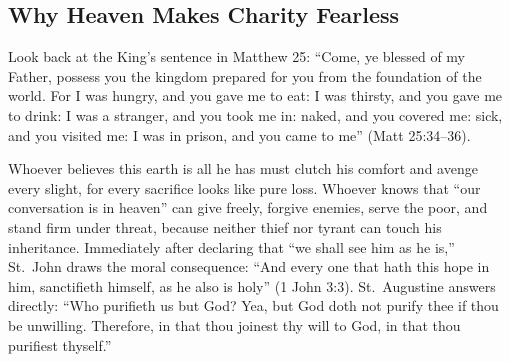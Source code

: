 \subsection*{Why Heaven Makes Charity Fearless}

Look back at the King's sentence in Matthew 25: ``Come, ye blessed of my Father, possess you the kingdom prepared for you from the foundation of the world. For I was hungry, and you gave me to eat: I was thirsty, and you gave me to drink: I was a stranger, and you took me in: naked, and you covered me: sick, and you visited me: I was in prison, and you came to me'' (Matt 25:34--36).

Whoever believes this earth is all he has must clutch his comfort and avenge every slight, for every sacrifice looks like pure loss. Whoever knows that ``our conversation is in heaven'' can give freely, forgive enemies, serve the poor, and stand firm under threat, because neither thief nor tyrant can touch his inheritance. Immediately after declaring that ``we shall see him as he is,'' St.\ John draws the moral consequence: ``And every one that hath this hope in him, sanctifieth himself, as he also is holy'' (1 John 3:3). St.\ Augustine answers directly: ``Who purifieth us but God? Yea, but God doth not purify thee if thou be unwilling. Therefore, in that thou joinest thy will to God, in that thou purifiest thyself.''
